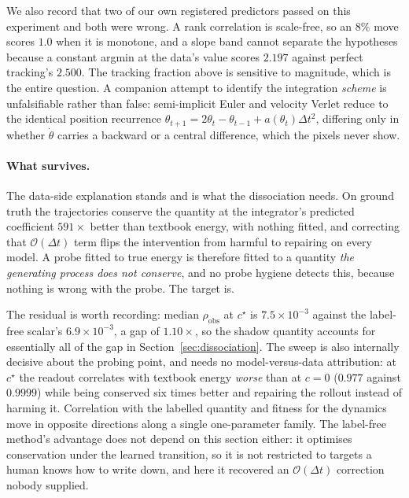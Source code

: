 We also record that two of our own registered predictors passed on this experiment and both were
wrong. A rank correlation is scale-free, so an $8\%$ move scores $1.0$ when it is monotone, and a
slope band cannot separate the hypotheses because a constant argmin at the data's value scores
$2.197$ against perfect tracking's $2.500$. The tracking fraction above is sensitive to magnitude,
which is the entire question. A companion attempt to identify the integration \emph{scheme} is
unfalsifiable rather than false: semi-implicit Euler and velocity Verlet reduce to the identical
position recurrence $\theta_{t+1} = 2\theta_t - \theta_{t-1} + a(\theta_t)\Delta t^2$, differing only
in whether $\dot\theta$ carries a backward or a central difference, which the pixels never show.

\paragraph{What survives.}
The data-side explanation stands and is what the dissociation needs. On ground truth the trajectories
conserve the quantity at the integrator's predicted coefficient $591\times$ better than textbook
energy, with nothing fitted, and correcting that $\mathcal{O}(\Delta t)$ term flips the intervention
from harmful to repairing on every model. A probe fitted to true energy is therefore fitted to a
quantity \emph{the generating process does not conserve}, and no probe hygiene detects this, because
nothing is wrong with the probe. The target is.

The residual is worth recording: median $\rho_{\mathrm{obs}}$ at $c^\star$ is $7.5\times10^{-3}$
against the label-free scalar's $6.9\times10^{-3}$, a gap of $1.10\times$, so the shadow quantity
accounts for essentially all of the gap in Section~\ref{sec:dissociation}. The sweep is also
internally decisive about the probing point, and needs no model-versus-data attribution: at $c^\star$
the readout correlates with textbook energy \emph{worse} than at $c=0$ ($0.977$ against $0.9999$)
while being conserved six times better and repairing the rollout instead of harming it. Correlation
with the labelled quantity and fitness for the dynamics move in opposite directions along a single
one-parameter family. The label-free method's advantage does not depend on this section either: it
optimises conservation under the learned transition, so it is not restricted to targets a human knows
how to write down, and here it recovered an $\mathcal{O}(\Delta t)$ correction nobody supplied.
